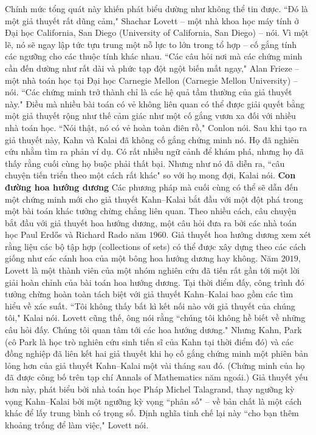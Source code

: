 \begin{multicols}{2}
\begin{figure}[H]
		\vspace*{-15pt}
	\end{figure}
	Chính mức tổng quát này khiến phát biểu dường như không thể tin được. ``Đó là một giả thuyết rất dũng cảm," Shachar Lovett -- một nhà khoa học máy tính ở Đại học California, San Diego (University of California, San Diego) -- nói. Vì một lẽ, nó sẽ ngay lập tức tựu trung một nỗ lực to lớn trong tổ hợp -- cố gắng tính các ngưỡng cho các thuộc tính khác nhau. ``Các câu hỏi nơi mà các chứng minh cần đến dường như rất dài và phức tạp đột ngột biến mất ngay," Alan Frieze -- một nhà toán học tại Đại học Carnegie Mellon (Carnegie Mellon University) -- nói. ``Các chứng minh trở thành chỉ là các hệ quả tầm thường của giả thuyết này."
	\vskip 0.1cm
	Điều mà nhiều bài toán có vẻ không liên quan có thể được giải quyết bằng một giả thuyết rộng như thế cảm giác như một cố gắng vươn xa đối với nhiều nhà toán học. ``Nói thật, nó có vẻ hoàn toàn điên rồ," Conlon nói. Sau khi tạo ra giả thuyết này, Kahn và Kalai đã không cố gắng chứng minh nó. Họ đã nghiên cứu nhằm tìm ra phản ví dụ. Có rất nhiều ngữ cảnh để khám phá, nhưng họ đã thấy rằng cuối cùng họ buộc phải thất bại.
	\vskip 0.1cm
	Nhưng như nó đã diễn ra, ``câu chuyện tiến triển theo một cách rất khác" so với họ mong đợi, Kalai nói.
	\vskip 0.1cm
	\textbf{\color{duongvaotoanhoc}Con đường hoa hướng dương}
	\vskip 0.1cm
	Các phương pháp mà cuối cùng có thể sẽ dẫn đến một chứng minh mới cho giả thuyết Kahn--Kalai bắt đầu với một đột phá trong một bài toán khác tưởng chừng chẳng liên quan. Theo nhiều cách, câu chuyện bắt đầu với giả thuyết hoa hướng dương, một câu hỏi đưa ra bởi các nhà toán học Paul Erdős và Richard Rado năm $1960$. Giả thuyết hoa hướng dương xem xét rằng liệu các bộ tập hợp (collections of sets) có thể được xây dựng theo các cách giống như các cánh hoa của một bông hoa hướng dương hay không.
	\vskip 0.1cm
	Năm $2019$, Lovett là một thành viên của một nhóm nghiên cứu đã tiến rất gần tới một lời giải hoàn chỉnh của bài toán hoa hướng dương. Tại thời điểm đấy, công trình đó tưởng chừng hoàn toàn tách biệt với giả thuyết Kahn--Kalai bao gồm các tìm hiểu về xác suất. ``Tôi không thấy bất kì kết nối nào với giả thuyết của chúng tôi," Kalai nói. Lovett cũng thế, ông nói rằng ``chúng tôi không hề biết về những câu hỏi đấy. Chúng tôi quan tâm tới các hoa hướng dương."
	Nhưng Kahn, Park (cô Park là học trò nghiên cứu sinh tiến sĩ của Kahn tại thời điểm đó) và các đồng nghiệp đã liên kết hai giả thuyết khi họ cố gắng chứng minh một phiên bản lỏng hơn của giả thuyết Kahn--Kalai một vài tháng sau đó. (Chứng minh của họ đã được công bố trên tạp chí  Annals of Mathematics năm ngoái.) Giả thuyết yếu hơn này, phát biểu bởi nhà toán học Pháp Michel Talagrand, thay ngưỡng kỳ vọng Kahn--Kalai bởi một ngưỡng kỳ vọng ``phân số" -- về bản chất là một cách khác để lấy trung bình có trọng số. Định nghĩa tinh chế lại này ``cho bạn thêm khoảng trống để làm việc," Lovett nói.

\end{multicols}
